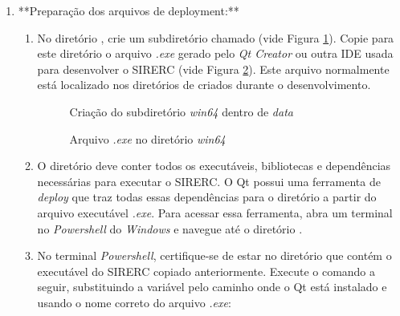 \documentclass[a4paper,11pt]{article}
\newcommand{\sistema}{\textsf{SIRERC}}
\newcommand{\qtcreator}{\textit{Qt Creator}}
\newcommand{\windows}{\textit{Windows}}
\begin{document}
\begin{enumerate}
	\item **Preparação dos arquivos de deployment:**
	\begin{enumerate}
		\item No diretório , crie um subdiretório chamado  (vide Figura \ref{fig:sirercdatawin64}). Copie para este diretório o arquivo \emph{.exe} gerado pelo \qtcreator{} ou outra IDE usada para desenvolver o \sistema{} (vide Figura \ref{fig:sirercdataexe}). Este arquivo normalmente está localizado nos diretórios de  criados durante o desenvolvimento.
		
		\begin{figure}[H]\centering
			\caption{Criação do subdiretório \emph{win64} dentro de \emph{data}}\label{fig:sirercdatawin64}
		\end{figure}
		
		\begin{figure}[H]\centering
			\caption{Arquivo \emph{.exe} no diretório \emph{win64}}\label{fig:sirercdataexe}
		\end{figure}
		
		\item O diretório  deve conter todos os executáveis, bibliotecas e dependências necessárias para executar o \sistema{}. O Qt possui uma ferramenta de \emph{deploy} que traz todas essas dependências para o diretório a partir do arquivo executável \emph{.exe}. Para acessar essa ferramenta, abra um terminal no \emph{Powershell} do \emph{\windows{}} e navegue até o diretório .
		
		\item No terminal \emph{Powershell}, certifique-se de estar no diretório que contém o executável do \sistema{} copiado anteriormente. Execute o comando a seguir, substituindo a variável  pelo caminho onde o Qt está instalado e usando o nome correto do arquivo \emph{.exe}:
		

\end{enumerate}
\end{enumerate}
\end{document}
